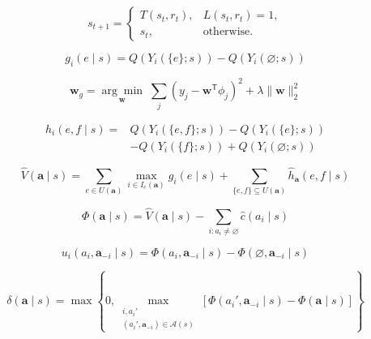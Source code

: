 \documentclass{article}
\begin{document}
\begin{equation}
s_{t+1}=\begin{cases}T(s_t,r_t),&L(s_t,r_t)=1,\\s_t,&\text{otherwise}.\end{cases}
\tag{1}
\end{equation}

\begin{equation}
g_i(e\mid s)=Q\!\left(Y_i(\{e\};s)\right)-Q\!\left(Y_i(\varnothing;s)\right)
\tag{3}
\end{equation}

\begin{equation}
\mathbf w_g=\underset{\mathbf w}{\arg\min}\;\sum_j\left(y_j-\mathbf w^{\mathsf T}\phi_j\right)^2+\lambda\lVert\mathbf w\rVert_2^2
\tag{5}
\end{equation}

\begin{equation}
\begin{aligned}h_i(e,f\mid s)={}&Q\!\left(Y_i(\{e,f\};s)\right)-Q\!\left(Y_i(\{e\};s)\right)\\&-Q\!\left(Y_i(\{f\};s)\right)+Q\!\left(Y_i(\varnothing;s)\right)\end{aligned}
\tag{6}
\end{equation}

\begin{equation}
\widehat V(\mathbf a\mid s)=\sum_{e\in U(\mathbf a)}\max_{i\in I_e(\mathbf a)}\widehat g_i(e\mid s)+\sum_{\{e,f\}\subseteq U(\mathbf a)}\widehat h_{\mathbf a}(e,f\mid s)
\tag{8}
\end{equation}

\begin{equation}
\Phi(\mathbf a\mid s)=\widehat V(\mathbf a\mid s)-\sum_{i:a_i\ne\varnothing}\widehat c(a_i\mid s)
\tag{9}
\end{equation}

\begin{equation}
u_i(a_i,\mathbf a_{-i}\mid s)=\Phi(a_i,\mathbf a_{-i}\mid s)-\Phi(\varnothing,\mathbf a_{-i}\mid s)
\tag{10}
\end{equation}

\begin{equation}
\delta(\mathbf a\mid s)=\max\!\left\{0,\max_{\substack{i,a_i'\\(a_i',\mathbf a_{-i})\in\mathcal A(s)}}\!\left[\Phi(a_i',\mathbf a_{-i}\mid s)-\Phi(\mathbf a\mid s)\right]\right\}
\tag{12}
\end{equation}
\end{document}
